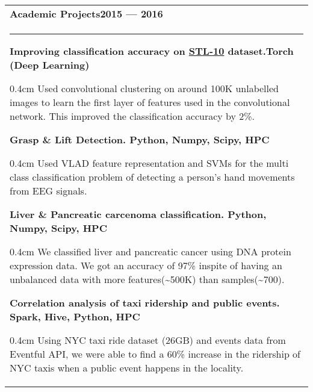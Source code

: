 \documentclass{article}
\newenvironment{projectdescription}{\begin{adjustwidth}{0.4cm}{}}{\end{adjustwidth}}
\begin{document}
\begin{tabular}{p{\dimexpr\linewidth-2\tabcolsep}}
	\bfseries \large{Academic Projects}\hfill 2015 --- 2016 \mdseries \\
	\noindent\rule{\textwidth}{0.4pt}
	\bfseries Improving classification accuracy on \href{http://cs.stanford.edu/~acoates/stl10/}{STL-10} dataset.\mdseries \hfill Torch (Deep Learning)

	\begin{projectdescription}
	Used convolutional clustering on around 100K unlabelled images to learn the first layer of features used in the convolutional network.  
	This improved the classification accuracy by 2\%.
	\end{projectdescription}
	\smallskip

	\bfseries Grasp \& Lift Detection. \mdseries \hfill Python, Numpy, Scipy, HPC 
	\begin{projectdescription}
	Used VLAD feature representation and SVMs for the multi class classification problem of detecting a person's hand movements from EEG signals.
	\end{projectdescription}
	\smallskip
	\bfseries Liver \& Pancreatic carcenoma classification.  \mdseries\hfill Python, Numpy, Scipy, HPC
	\begin{projectdescription}
		We classified liver and pancreatic cancer using DNA protein expression data.  We got an accuracy of 97\% inspite of having an unbalanced data with more features(\textasciitilde500K) than samples(\textasciitilde700).
	\end{projectdescription}

	\smallskip

	\bfseries Correlation analysis of taxi ridership and public events. \mdseries \hfill Spark, Hive, Python, HPC
	\begin{projectdescription}
			Using NYC taxi ride dataset (26GB) and events data from Eventful API, we were able to find a 60\% increase in the ridership of NYC taxis when a public event happens in the locality.
	\end{projectdescription}
\end{tabular}
\bigskip
\end{document}
